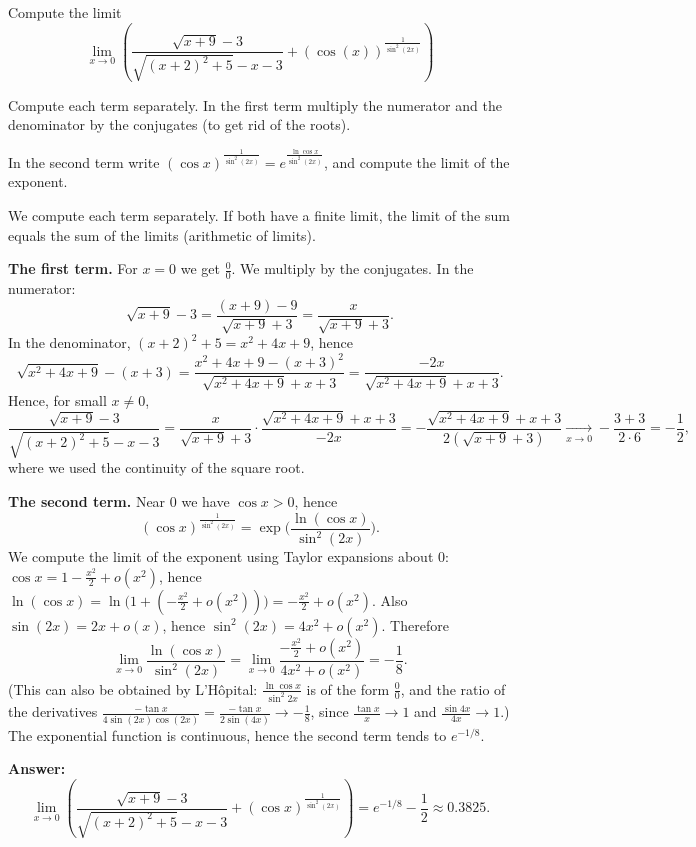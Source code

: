 
\begin{question}
Compute the limit
\[ \lim_{x\to 0}\left(\frac{\sqrt{x+9}-3}{\sqrt{(x+2)^2+5}-x-3}+(\cos(x))^{\frac{1}{\sin^2(2x)}}\right) \]
\end{question}

\begin{hint}
Compute each term separately. In the first term multiply the numerator and the denominator by the conjugates (to get rid of the roots).
\end{hint}

\begin{hint}
In the second term write $(\cos x)^{\frac{1}{\sin^2(2x)}}=e^{\frac{\ln\cos x}{\sin^2(2x)}}$, and compute the limit of the exponent.
\end{hint}

\begin{solution}
We compute each term separately. If both have a finite limit, the limit of the sum equals the sum of the limits (arithmetic of limits).

\textbf{The first term.} For $x=0$ we get $\frac{0}{0}$. We multiply by the conjugates. In the numerator:
\[ \sqrt{x+9}-3=\frac{(x+9)-9}{\sqrt{x+9}+3}=\frac{x}{\sqrt{x+9}+3}. \]
In the denominator, $(x+2)^2+5=x^2+4x+9$, hence
\[ \sqrt{x^2+4x+9}-(x+3)=\frac{x^2+4x+9-(x+3)^2}{\sqrt{x^2+4x+9}+x+3}=\frac{-2x}{\sqrt{x^2+4x+9}+x+3}. \]
Hence, for small $x\neq0$,
\[ \frac{\sqrt{x+9}-3}{\sqrt{(x+2)^2+5}-x-3}=\frac{x}{\sqrt{x+9}+3}\cdot\frac{\sqrt{x^2+4x+9}+x+3}{-2x}
=-\frac{\sqrt{x^2+4x+9}+x+3}{2(\sqrt{x+9}+3)}\xrightarrow[x\to0]{}-\frac{3+3}{2\cdot 6}=-\frac12 , \]
where we used the continuity of the square root.

\textbf{The second term.} Near $0$ we have $\cos x>0$, hence
\[ (\cos x)^{\frac{1}{\sin^2(2x)}}=\exp\Big(\frac{\ln(\cos x)}{\sin^2(2x)}\Big). \]
We compute the limit of the exponent using Taylor expansions about $0$:
$\cos x=1-\frac{x^2}{2}+o(x^2)$, hence $\ln(\cos x)=\ln\big(1+(-\frac{x^2}{2}+o(x^2))\big)=-\frac{x^2}{2}+o(x^2)$.
Also $\sin(2x)=2x+o(x)$, hence $\sin^2(2x)=4x^2+o(x^2)$. Therefore
\[ \lim_{x\to0}\frac{\ln(\cos x)}{\sin^2(2x)}=\lim_{x\to0}\frac{-\frac{x^2}{2}+o(x^2)}{4x^2+o(x^2)}=-\frac18 . \]
(This can also be obtained by L'Hôpital: $\frac{\ln\cos x}{\sin^2 2x}$ is of the form $\frac00$, and the ratio of the derivatives $\frac{-\tan x}{4\sin(2x)\cos(2x)}=\frac{-\tan x}{2\sin(4x)}\to -\frac{1}{8}$, since $\frac{\tan x}{x}\to1$ and $\frac{\sin 4x}{4x}\to 1$.)
The exponential function is continuous, hence the second term tends to $e^{-1/8}$.

\textbf{Answer:}
\[ \lim_{x\to 0}\left(\frac{\sqrt{x+9}-3}{\sqrt{(x+2)^2+5}-x-3}+(\cos x)^{\frac{1}{\sin^2(2x)}}\right)=\boxed{e^{-1/8}-\frac12}\approx 0.3825 . \]
\end{solution}
